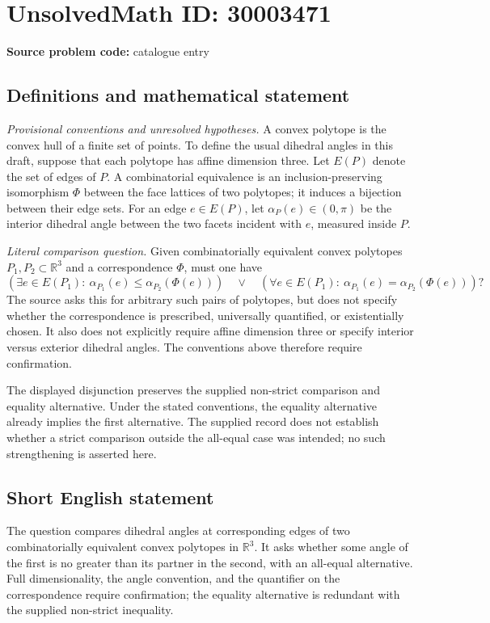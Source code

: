 \documentclass[11pt]{article}
\newcommand{\R}{\mathbb{R}}
\begin{document}
\section*{UnsolvedMath ID: 30003471}
\textbf{Source problem code:} catalogue entry
\subsection{Definitions and mathematical statement}
\textit{Provisional conventions and unresolved hypotheses.} A convex polytope is the convex hull of a finite set of points. To define the usual dihedral angles in this draft, suppose that each polytope has affine dimension three. Let \(E(P)\) denote the set of edges of \(P\). A combinatorial equivalence is an inclusion-preserving isomorphism \(\Phi\) between the face lattices of two polytopes; it induces a bijection between their edge sets. For an edge \(e\in E(P)\), let \(\alpha_P(e)\in(0,\pi)\) be the interior dihedral angle between the two facets incident with \(e\), measured inside \(P\).

\textit{Literal comparison question.} Given combinatorially equivalent convex polytopes \(P_1,P_2\subset\R^3\) and a correspondence \(\Phi\), must one have
\[
\left(\exists e\in E(P_1):\ \alpha_{P_1}(e)\leq\alpha_{P_2}(\Phi(e))\right)
\quad\lor\quad
\left(\forall e\in E(P_1):\ \alpha_{P_1}(e)=\alpha_{P_2}(\Phi(e))\right)?
\]
The source asks this for arbitrary such pairs of polytopes, but does not specify whether the correspondence is prescribed, universally quantified, or existentially chosen. It also does not explicitly require affine dimension three or specify interior versus exterior dihedral angles. The conventions above therefore require confirmation.

The displayed disjunction preserves the supplied non-strict comparison and equality alternative. Under the stated conventions, the equality alternative already implies the first alternative. The supplied record does not establish whether a strict comparison outside the all-equal case was intended; no such strengthening is asserted here.
\subsection{Short English statement}
The question compares dihedral angles at corresponding edges of two combinatorially equivalent convex polytopes in \(\R^3\). It asks whether some angle of the first is no greater than its partner in the second, with an all-equal alternative. Full dimensionality, the angle convention, and the quantifier on the correspondence require confirmation; the equality alternative is redundant with the supplied non-strict inequality.
\end{document}
